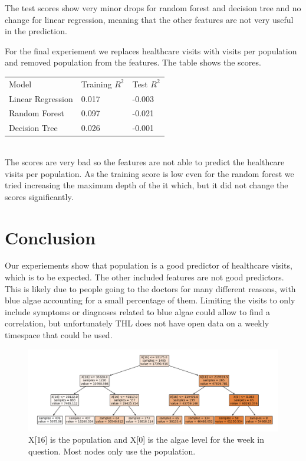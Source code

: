 \documentclass[a4paper, 12pt, english]{article}
\begin{document}
The test scores show very minor drops for random forest
and decision tree and no change for linear regression,
meaning that the other features are not very useful
in the prediction.

For the final experiement we replaces healthcare
visits with visits per population and
removed population from the features.
The table shows the scores.\\

\begin{tabular}{l l l}
Model & Training \(R^2\) & Test \(R^2\) \\
Linear Regression & 0.017 & -0.003 \\
Random Forest & 0.097 & -0.021 \\
Decision Tree & 0.026 & -0.001 \\
\end{tabular}
\\

The scores are very bad so the features are not able
to predict the healthcare visits per population.
As the training score is low even for
the random forest we tried increasing the maximum depth of
the it which, but it did not change the scores significantly.

\section{Conclusion}
Our experiements show that population is
a good predictor of healthcare visits, which
is to be expected. The other included features
are not good predictors. This is likely due
to people going to the doctors for many different
reasons, with blue algae accounting for a small
percentage of them. Limiting the visits
to only include symptoms or diagnoses related to
blue algae could allow to find a correlation,
but unfortunately THL does not have open
data on a weekly timespace that could be used.

\begin{figure}
\includegraphics[width=\textwidth]{tree1}
\caption{
X[16] is the population and X[0] is the algae level for the week in question.
Most nodes only use the population.
}
\label{tree1}
\end{figure}
\end{document}
